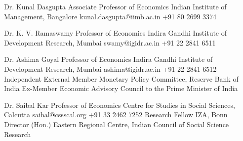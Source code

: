 %
%
%


\vspace*{10pt}

\begin{referees}
		{Dr. Kunal Dasgupta}
		{Associate Professor of Economics}
		{Indian Institute of Management, Bangalore}
		{kunal.dasgupta@iimb.ac.in}
		{+91 80 2699 3374}

		{Dr. K. V. Ramaswamy}
		{Professor of Economics}
		{Indira Gandhi Institute of Development Research, Mumbai}
		{swamy@igidr.ac.in}
		{+91 22 2841 6511}

	\lreferee
		{Dr. Ashima Goyal}
		{Professor of Economics}
		{Indira Gandhi Institute of Development Research, Mumbai}
		{ashima@igidr.ac.in}
		{+91 22 2841 6512}
		{Independent External Member}
		{Monetary Policy Committee, Reserve Bank of India}
		{Ex-Member}
		{Economic Advisory Council to the Prime Minister of India}

	\lreferee
		{Dr. Saibal Kar}
		{Professor of Economics}
		{Centre for Studies in Social Sciences, Calcutta}
		{saibal@cssscal.org}
		{+91 33 2462 7252}
		{Research Fellow}
		{IZA, Bonn}
		{Director (Hon.)}
		{Eastern Regional Centre, Indian Council of Social Science Research}

\end{referees}